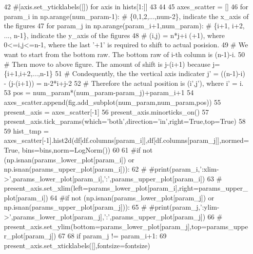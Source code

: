 \begin{DoxyCode}
42 \textcolor{comment}{#[axis.set\_yticklabels([]) for  axis in hists[1:]]}
43     
44    
45     axes\_scatter = []
46     \textcolor{keywordflow}{for} param\_i \textcolor{keywordflow}{in} np.arange(num\_param-1): \textcolor{comment}{# \{0,1,2,...,num-2\}, indicate the x\_axis of the figures}
47         \textcolor{keywordflow}{for} param\_j \textcolor{keywordflow}{in} np.arange(param\_i+1,num\_param): \textcolor{comment}{# \{i+1, i+2, ..., n-1\}, indicate the y\_axis of the
       figures }
48     \textcolor{comment}{# (i,j) = n*j+i (+1), where 0<=i,j<=n-1, where the last '+1' is required to shift to actual posision.}
49     \textcolor{comment}{# We want to start from the bottom raw. The bottom raw of i-th column is (n-1)-i.}
50     \textcolor{comment}{# Then move to above figure. The amount of shift is j-(i+1) because j=\{i+1,i+2,...,n-1\}}
51     \textcolor{comment}{# Condequently, the the vertical axis indicater j' = ((n-1)-i) - (j-(i+1)) = n-2*i+j-2}
52     \textcolor{comment}{# Therefore the actual position is (i',j'), where i' = i.}
53             pos = num\_param*(num\_param-param\_j)+param\_i+1
54             axes\_scatter.append(fig.add\_subplot(num\_param,num\_param,pos))
55             present\_axis = axes\_scatter[-1]
56             present\_axis.minorticks\_on()
57             present\_axis.tick\_params(which=\textcolor{stringliteral}{'both'},direction=\textcolor{stringliteral}{'in'},right=\textcolor{keyword}{True},top=\textcolor{keyword}{True})
58         
59             hist\_tmp = axes\_scatter[-1].hist2d(df[df.columns[param\_i]],df[df.columns[param\_j]],normed=\textcolor{keyword}{True},
      bins=bins,norm=LogNorm())
60             
61             \textcolor{comment}{#if not (np.isnan(params\_lower\_plot[param\_i]) or np.isnan(params\_upper\_plot[param\_i])):}
62             \textcolor{comment}{#    #print(param\_i,':xlim->',params\_lower\_plot[param\_i],':',params\_upper\_plot[param\_i])}
63             \textcolor{comment}{#    present\_axis.set\_xlim(left=params\_lower\_plot[param\_i],right=params\_upper\_plot[param\_i])}
64             \textcolor{comment}{#if not (np.isnan(params\_lower\_plot[param\_j]) or np.isnan(params\_upper\_plot[param\_j])):}
65             \textcolor{comment}{#    #print(param\_j,':ylim->',params\_lower\_plot[param\_j],':',params\_upper\_plot[param\_j])}
66             \textcolor{comment}{#    present\_axis.set\_ylim(bottom=params\_lower\_plot[param\_j],top=params\_upper\_plot[param\_j])}
67             
68             \textcolor{keywordflow}{if} param\_j != param\_i+1:
69                 present\_axis.set\_xticklabels([],fontsize=fontsize)

\end{DoxyCode}
